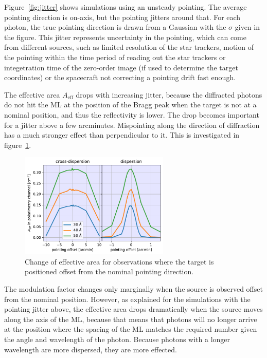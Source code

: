 \documentclass[]{spie}  %
\begin{document}
Figure~\ref{fig:jitter} shows simulations using an unsteady pointing. The average pointing direction is on-axis, but the pointing jitters around that. For each photon, the true pointing direction is drawn from a Gaussian with the $\sigma$ given in the figure. This jitter represents uncertainty in the pointing, which can come from different sources, such as limited resolution of the star trackers, motion of the pointing within the time period of reading out the star trackers or integetration time of the zero-order image (if used to determine the target coordinates) or the spacecraft not correcting a pointing drift fast enough.

The effective area $A_{\mathrm{eff}}$ drops with increasing jitter, because the diffracted photons do not hit the ML at the position of the Bragg peak when the target is not at a nominal position, and thus the reflectivity is lower. The drop becomes important for a jitter above a few arcminutes. Mispointing along the direction of diffraction has a much stronger effect than perpendicular to it. This is investigated in figure~\ref{fig:offset_point}.

\begin{figure} [ht]
  \begin{center}
    \includegraphics[height=5cm]{offset_point.pdf}
  \end{center}
  \caption
      { \label{fig:offset_point}Change of effective area for observations where the target is positioned offset from the nominal pointing direction. 
}
\end{figure}

The modulation factor changes only marginally when the source is observed offset from the nominal position. However, as explained for the simulations with the pointing jitter above, the effective area drops dramatically when the source  moves along the axis of the ML, because that means that photons will no longer arrive at the position where the spacing of the ML matches the required number given the angle and wavelength of the photon. Because photons with a longer wavelength are more dispersed, they are more effected.
\end{document}
